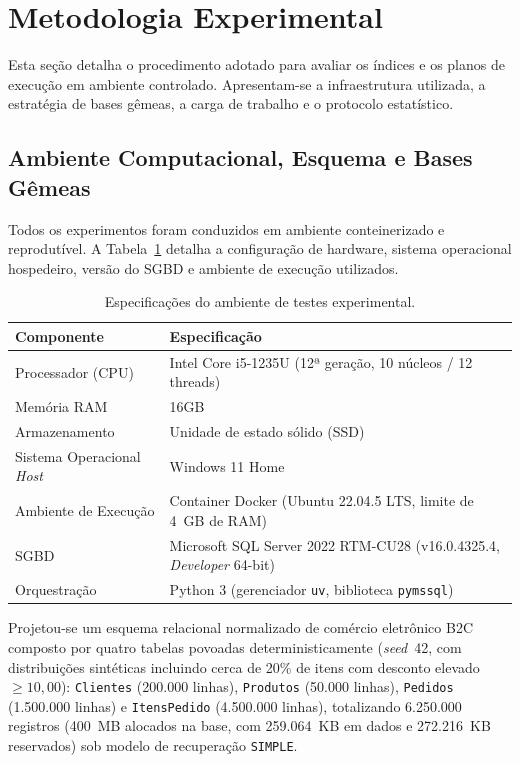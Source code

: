 \documentclass[12pt]{article}
\begin{document}
\section{Metodologia Experimental}

Esta seção detalha o procedimento adotado para avaliar os índices e os planos de execução em ambiente controlado. Apresentam-se a infraestrutura utilizada, a estratégia de bases gêmeas, a carga de trabalho e o protocolo estatístico.

\subsection{Ambiente Computacional, Esquema e Bases Gêmeas}

Todos os experimentos foram conduzidos em ambiente conteinerizado e reprodutível. A Tabela~\ref{tab:ambiente} detalha a configuração de hardware, sistema operacional hospedeiro, versão do SGBD e ambiente de execução utilizados.

\begin{table}[htbp]
\centering
\caption{Especificações do ambiente de testes experimental.}
\label{tab:ambiente}
\scriptsize
\setlength{\tabcolsep}{6pt}
\renewcommand{\arraystretch}{1.25}
\begin{tabular}{|l|l|}
\hline
\textbf{Componente} & \textbf{Especificação} \\
\hline
Processador (CPU) & Intel Core i5-1235U (12ª geração, 10 núcleos / 12 threads) \\
\hline
Memória RAM & 16GB \\
\hline
Armazenamento & Unidade de estado sólido (SSD) \\
\hline
Sistema Operacional \textit{Host} & Windows 11 Home \\
\hline
Ambiente de Execução & Container Docker (Ubuntu 22.04.5 LTS, limite de 4~GB de RAM) \\
\hline
SGBD & Microsoft SQL Server 2022 RTM-CU28 (v16.0.4325.4, \textit{Developer} 64-bit) \\
\hline
Orquestração & Python 3 (gerenciador \texttt{uv}, biblioteca \texttt{pymssql}) \\
\hline
\end{tabular}
\end{table}

Projetou-se um esquema relacional normalizado de comércio eletrônico B2C composto por quatro tabelas povoadas deterministicamente (\textit{seed}~42, com distribuições sintéticas incluindo cerca de 20\% de itens com desconto elevado $\ge 10{,}00$): \texttt{Clientes} (200.000 linhas), \texttt{Produtos} (50.000 linhas), \texttt{Pedidos} (1.500.000 linhas) e \texttt{ItensPedido} (4.500.000 linhas), totalizando 6.250.000 registros (400~MB alocados na base, com 259.064~KB em dados e 272.216~KB reservados) sob modelo de recuperação \texttt{SIMPLE}.
\end{document}
